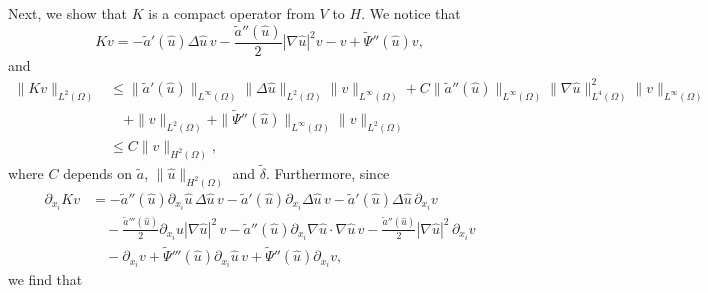 \documentclass[11pt,reqno]{amsart}
\theoremstyle{remark}
\newcommand \norm[1] {\left\Vert #1\right\Vert}
\numberwithin{equation}{section}
\begin{document}
Next, we show that $K$ is a compact operator from $V$ to $H$.
We notice that
$$
K v=   - \widetilde{a}'(\widehat{u}) \Delta \widehat{u} \, v - \frac{\widetilde{a}''(\widehat{u})}{2}|\nabla \widehat{u}|^2v -v + \widetilde{\Psi}''(\widehat{u})v,
$$
and
\begin{align*}
\| K v\|_{L^2(\Omega)}
&\leq \| \widetilde{a}'(\widehat{u}) \|_{L^\infty(\Omega)} \| \Delta \widehat{u}\|_{L^2(\Omega)} \| v\|_{L^\infty(\Omega)}
+ C \| \widetilde{a}''(\widehat{u}) \|_{L^\infty(\Omega)} \| \nabla \widehat{u}\|_{L^4(\Omega)}^2 \| v\|_{L^\infty(\Omega)}
\\
&\quad
+ \| v\|_{L^2(\Omega)} + \| \widetilde{\Psi}''(\widehat{u}) \|_{L^\infty(\Omega)} \| v \|_{L^2(\Omega)}
\\
&
\leq C \| v\|_{H^2(\Omega)},
\end{align*}
where $C$ depends on $\widetilde{a}$, $\| \widehat{u}\|_{H^2(\Omega)}$ and $\widetilde{\delta}$.
Furthermore, since
\begin{align*}
\partial_{x_i} Kv &= - \widetilde{a}''(\widehat{u}) \partial_{x_i} \widehat{u} \,\Delta \widehat{u} \, v
-\widetilde{a}'(\widehat{u})\partial_{x_i} \Delta \widehat{u} \, v
-\widetilde{a}'(\widehat{u}) \Delta \widehat{u} \, \partial_{x_i} v
\\
& \quad - \frac{\widetilde{a}'''(\widehat{u})}{2} \partial_{x_i} \widehat{u} |\nabla \widehat{u}|^2 \, v
- \widetilde{a}''(\widehat{u}) \partial_{x_i} \nabla \widehat{u} \cdot \nabla \widehat{u} \, v
- \frac{\widetilde{a}''(\widehat{u})}{2}|\nabla \widehat{u}|^2 \, \partial_{x_i} v
\\
& \quad -\partial_{x_i} v + \widetilde{\Psi}'''(\widehat{u}) \partial_{x_i}\widehat{u}\, v
+ \widetilde{\Psi}''(\widehat{u}) \partial_{x_i} v, 
\end{align*}
we find that
\end{document}
